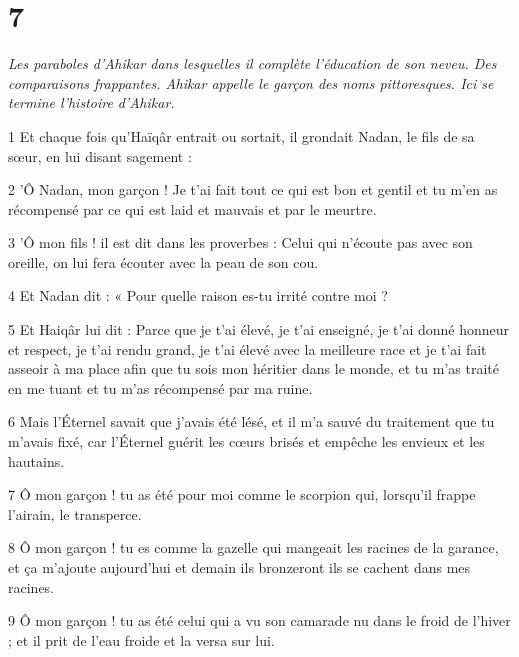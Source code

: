 \chapter{7}

\par \textit{Les paraboles d'Ahikar dans lesquelles il complète l'éducation de son neveu. Des comparaisons frappantes. Ahikar appelle le garçon des noms pittoresques. Ici se termine l'histoire d'Ahikar.}

\par 1 Et chaque fois qu'Haïqâr entrait ou sortait, il grondait Nadan, le fils de sa sœur, en lui disant sagement :

\par 2 'Ô Nadan, mon garçon ! Je t'ai fait tout ce qui est bon et gentil et tu m'en as récompensé par ce qui est laid et mauvais et par le meurtre.

\par 3 'Ô mon fils ! il est dit dans les proverbes : Celui qui n'écoute pas avec son oreille, on lui fera écouter avec la peau de son cou.

\par 4 Et Nadan dit : « Pour quelle raison es-tu irrité contre moi ?

\par 5 Et Haiqâr lui dit : Parce que je t'ai élevé, je t'ai enseigné, je t'ai donné honneur et respect, je t'ai rendu grand, je t'ai élevé avec la meilleure race et je t'ai fait asseoir à ma place afin que tu sois mon héritier dans le monde, et tu m'as traité en me tuant et tu m'as récompensé par ma ruine.

\par 6 Mais l'Éternel savait que j'avais été lésé, et il m'a sauvé du traitement que tu m'avais fixé, car l'Éternel guérit les cœurs brisés et empêche les envieux et les hautains.

\par 7 Ô mon garçon ! tu as été pour moi comme le scorpion qui, lorsqu'il frappe l'airain, le transperce.

\par 8 Ô mon garçon ! tu es comme la gazelle qui mangeait les racines de la garance, et ça m'ajoute aujourd'hui et demain ils bronzeront ils se cachent dans mes racines.

\par 9 Ô mon garçon ! tu as été celui qui a vu son camarade nu dans le froid de l'hiver ; et il prit de l'eau froide et la versa sur lui.

